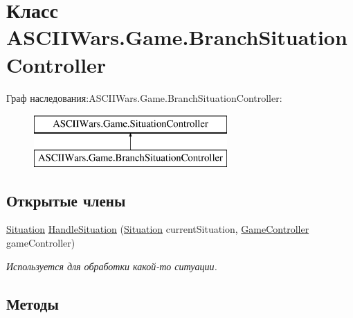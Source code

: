 \hypertarget{class_a_s_c_i_i_wars_1_1_game_1_1_branch_situation_controller}{}\section{Класс A\+S\+C\+I\+I\+Wars.\+Game.\+Branch\+Situation\+Controller}
\label{class_a_s_c_i_i_wars_1_1_game_1_1_branch_situation_controller}
Граф наследования\+:A\+S\+C\+I\+I\+Wars.\+Game.\+Branch\+Situation\+Controller\+:\begin{figure}[H]
\begin{center}
\leavevmode
\includegraphics[height=2.000000cm]{class_a_s_c_i_i_wars_1_1_game_1_1_branch_situation_controller}
\end{center}
\end{figure}
\subsection*{Открытые члены}
\begin{DoxyCompactItemize}
\item 
\hyperlink{class_a_s_c_i_i_wars_1_1_game_1_1_situation}{Situation} \hyperlink{class_a_s_c_i_i_wars_1_1_game_1_1_branch_situation_controller_abf7662c8744efb91a97ad3aa382f47c7}{Handle\+Situation} (\hyperlink{class_a_s_c_i_i_wars_1_1_game_1_1_situation}{Situation} current\+Situation, \hyperlink{class_a_s_c_i_i_wars_1_1_game_1_1_game_controller}{Game\+Controller} game\+Controller)
\begin{DoxyCompactList}\small\item\em Используется для обработки какой-\/то ситуации. \end{DoxyCompactList}\end{DoxyCompactItemize}


\subsection{Методы}
\hypertarget{class_a_s_c_i_i_wars_1_1_game_1_1_branch_situation_controller_abf7662c8744efb91a97ad3aa382f47c7}{}\label{class_a_s_c_i_i_wars_1_1_game_1_1_branch_situation_controller_abf7662c8744efb91a97ad3aa382f47c7} 
